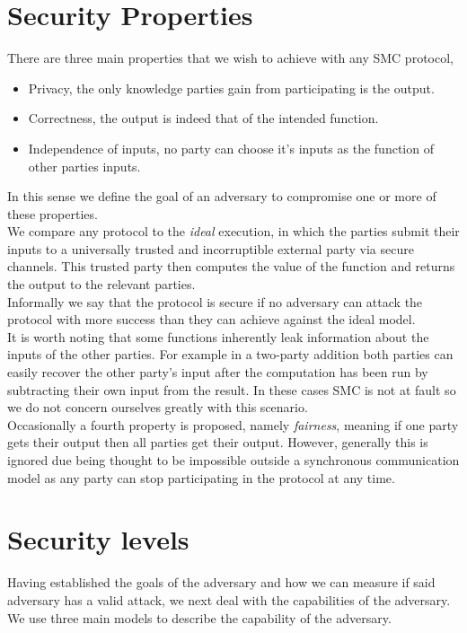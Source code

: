 \documentclass[ %
                    author={Nicholas Tutte},
                supervisor={Prof. Nigel Smart},
                    degree={MEng},
                     title={Secure Two Party Computation},
                  subtitle={A practical comparison of recent protocols},
                      type={Research - GG1K},
                      year={2015} ]{dissertation}
\begin{document}
		\section{Security Properties} \label{sub:SecurityProperties}
			There are three main properties that we wish to achieve with any SMC protocol,
			\begin{itemize}
				\item Privacy, the only knowledge parties gain from participating is the output.
				\item Correctness, the output is indeed that of the intended function.
				\item Independence of inputs, no party can choose it's inputs as the function of other parties inputs.
			\end{itemize}

			In this sense we define the goal of an adversary to compromise one or more of these properties.\\

			We compare any protocol to the \emph{ideal} execution, in which the parties submit their inputs to a universally trusted and incorruptible external party via secure channels. This trusted party then computes the value of the function and returns the output to the relevant parties.\\

			Informally we say that the protocol is secure if no adversary can attack the protocol with more success than they can achieve against the ideal model.\\

			It is worth noting that some functions inherently leak information about the inputs of the other parties. For example in a two-party addition both parties can easily recover the other party's input after the computation has been run by subtracting their own input from the result. In these cases SMC is not at fault so we do not concern ourselves greatly with this scenario.\\

			Occasionally a fourth property is proposed, namely \emph{fairness}, meaning if one party gets their output then all parties get their output. However, generally this is ignored due being thought to be impossible outside a synchronous communication model as any party can stop participating in the protocol at any time.

		\section{Security levels}\label{sub:SecurityLevels}
			Having established the goals of the adversary and how we can measure if said adversary has a valid attack, we next deal with the capabilities of the adversary. We use three main models to describe the capability of the adversary.
\end{document}
